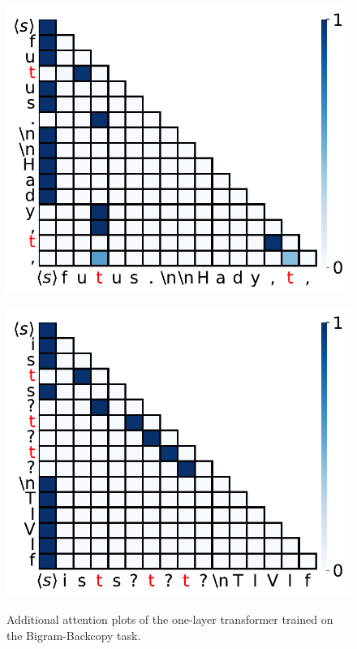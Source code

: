\begin{figure}[h]
\begin{minipage}{0.3\textwidth}
      \includegraphics[width=\linewidth]{Figures/BBM_appendix/app_attn_fig2.pdf}
  \end{minipage}
  \begin{minipage}{0.3\textwidth}
      \centering
      \label{appfig:trigger-sink}
      \vspace{-.2em}
      \includegraphics[width=\linewidth]{Figures/BBM_appendix/app_attn_fig3.pdf}
  \end{minipage}
  \caption{\small Additional attention plots of the one-layer transformer trained on the Bigram-Backcopy task.}
  \label{appfigure:more-attn}
  \vspace{-1em}
\end{figure}


